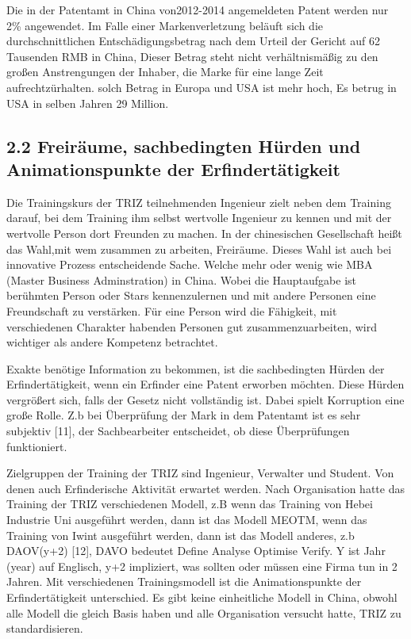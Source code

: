 \documentclass[11pt,a4paper]{article}
\begin{document}
Die in der Patentamt in China von2012-2014 angemeldeten Patent werden nur 2\%
angewendet. Im Falle einer Markenverletzung beläuft sich die
durchschnittlichen Entschädigungsbetrag nach dem Urteil der Gericht auf 62
Tausenden RMB in China, Dieser Betrag steht nicht verhältnismäßig zu den
großen Anstrengungen der Inhaber, die Marke für eine lange Zeit
aufrechtzürhalten. solch Betrag in Europa und USA ist mehr hoch, Es betrug in
USA in selben Jahren 29 Million.

\subsection{2.2 Freiräume, sachbedingten Hürden und Animationspunkte der
  Erfindertätigkeit} 

Die Trainingskurs der TRIZ teilnehmenden Ingenieur zielt neben dem Training
darauf, bei dem Training ihm selbst wertvolle Ingenieur zu kennen und mit der
wertvolle Person dort Freunden zu machen. In der chinesischen Gesellschaft
heißt das Wahl,mit wem zusammen zu arbeiten, Freiräume. Dieses Wahl ist auch
bei innovative Prozess entscheidende Sache. Welche mehr oder wenig wie
MBA (Master Business Adminstration) in China. Wobei die Hauptaufgabe ist
berühmten Person oder Stars kennenzulernen und mit andere Personen eine
Freundschaft zu verstärken. Für eine Person wird die Fähigkeit, mit
verschiedenen Charakter habenden Personen gut zusammenzuarbeiten, wird
wichtiger als andere Kompetenz betrachtet.

Exakte benötige Information zu bekommen, ist die sachbedingten Hürden der
Erfindertätigkeit, wenn ein Erfinder eine Patent erworben möchten. Diese
Hürden vergrößert sich, falls der Gesetz nicht vollständig ist. Dabei spielt
Korruption eine große Rolle. Z.b bei Überprüfung der Mark in dem Patentamt ist
es sehr subjektiv [11], der Sachbearbeiter entscheidet, ob diese Überprüfungen
funktioniert.

Zielgruppen der Training der TRIZ sind Ingenieur, Verwalter und Student. Von
denen auch Erfinderische Aktivität erwartet werden. Nach Organisation hatte
das Training der TRIZ verschiedenen Modell, z.B wenn das Training von Hebei
Industrie Uni ausgeführt werden, dann ist das Modell MEOTM, wenn das Training
von Iwint ausgeführt werden, dann ist das Modell anderes, z.b DAOV(y+2) [12],
DAVO bedeutet Define Analyse Optimise Verify.  Y ist Jahr (year) auf Englisch,
y+2 impliziert, was sollten oder müssen eine Firma tun in 2 Jahren. Mit
verschiedenen Trainingsmodell ist die Animationspunkte der Erfindertätigkeit
unterschied. Es gibt keine einheitliche Modell in China, obwohl alle Modell
die gleich Basis haben und alle Organisation versucht hatte, TRIZ zu
standardisieren.
\end{document}
